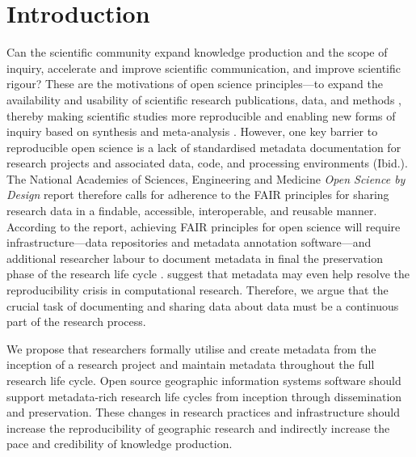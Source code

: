 \documentclass{isprs} %
\begin{document}

\maketitle


\sloppy

\section{Introduction}\label{Introduction}

Can the scientific community expand knowledge production and the scope of inquiry, accelerate and improve scientific communication, and improve scientific rigour?
These are the motivations of open science principles---to expand the availability and usability of scientific research publications, data, and methods \citep{NASEM2018}, thereby making scientific studies more reproducible  and enabling new forms of inquiry based on synthesis and meta-analysis \citep{NASEM2018,NASEM2019}.
However, one key barrier to reproducible open science is a lack of standardised metadata documentation for research projects and associated data, code, and processing environments (Ibid.).
The National Academies of Sciences, Engineering and Medicine \citep{NASEM2018} \textit{Open Science by Design} report therefore calls for adherence to the FAIR principles \citep{Wilkinson2016} for sharing research data in a findable, accessible, interoperable, and reusable manner.
According to the report, achieving FAIR principles for open science will require infrastructure---data repositories and metadata annotation software---and additional researcher labour to document metadata in final the preservation phase of the research life cycle \citep{NASEM2018}. 
\citet{Leipzig2021} suggest that metadata may even help resolve the reproducibility crisis in computational research.
Therefore, we argue that the crucial task of documenting and sharing data about data must be a continuous part of the research process.

We propose that researchers formally utilise and create metadata from the inception of a research project and maintain metadata throughout the full research life cycle.
Open source geographic information systems software should support metadata-rich research life cycles from inception through dissemination and preservation.
These changes in research practices and infrastructure should increase the reproducibility of geographic research and indirectly increase the pace and credibility of knowledge production. 
\end{document}

